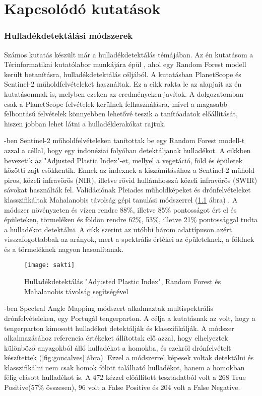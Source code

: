 \chapter{Kapcsolódó kutatások}
\label{ch:related_research}

\subsection{Hulladékdetektálási módszerek}

Számos kutatás készült már a hulladékdetektálás témájában. Az én kutatásom a Térinformatikai kutatólabor munkájára épül \cite{magyar2023}, ahol egy Random Forest modell került betanításra, hulladékdetektálás céljából. A kutatásban PlanetScope és Sentinel-2 műholdfelvételeket használtak. Ez a cikk rakta le az alapjait az én kutatásomnak is, melyben ezeken az eredményeken javítok. A dolgozatomban csak a PlanetScope felvételek kerülnek felhasználásra, mivel a magasabb felbontású felvételek könnyebben lehetővé teszik a tanítóadatok előállítását, hiszen jobban lehet látni a hulladéklerakókat rajtuk.

\cite{sakti2023}-ben Sentinel-2 műholdfelvételeken tanítottak be egy Random Forest modell-t azzal a céllal, hogy egy indonéziai folyóban detektáljanak hulladékot. A cikkben bevezetik az "Adjusted Plastic Index"-et, mellyel a vegetáció, föld és épületek közötti zajt csökkentik. Ennek az indexnek a kiszámításához a Sentinel-2 műhold piros, közeli infravörös (NIR), illetve rövid hullámhosszú közeli infravörös (SWIR) sávokat használták fel. Validációnak Pleiades műholdképeket és drónfelvételeket klasszifikáltak Mahalanobis távolság gépi tanulási módszerrel (\ref{fig:sakti} ábra) . A módszer növényzeten és vízen rendre 88\%, illetve 85\% pontosságot ért el és épületeken, törmeléken és földön rendre 62\%, 53\%, illetve 21\% pontossággal tudta a hulladékot detektálni. A cikk szerint az utóbbi három adattípuson azért visszafogottabbak az arányok, mert a spektrális értékei az épületeknek, a földnek és a törmeléknek nagyon hasonlítanak.

\begin{figure}[H]
	\centering
	\texttt{[image: sakti]}
	\caption{Hulladékdetektálás "Adjusted Plastic Index", Random Forest és Mahalanobis távolság segítségével \cite{sakti2023}}
    \label{fig:sakti}
\end{figure}


\cite{goncalves2022}-ben Spectral Angle Mapping módszert alkalmaztak multispektrális drónfelvételeken, egy Portugál tengerparton. A célja a kutatásnak az volt, hogy a tengerparton kimosott hulladékot detektálják és klasszifikálják. A módszer alkalmazásához referencia értékeket állítottak elő azzal, hogy elhelyeztek különböző anyagokból álló hulladékot a homokba, és ezekről drónfelvételt készítettek (\ref{fig:goncalves} ábra). Ezzel a módszerrel képesek voltak detektálni és klasszifikálni nem csak homok fölött található hulladékot, hanem a homokban félig elásott hulladékot is. A 472 kézzel előállított tesztadatból volt a 268 True Positive(57\% összesen), 96 volt a False Positive és 204 volt a False Negative.

